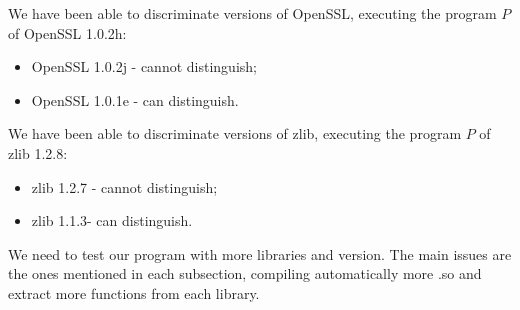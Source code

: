 \documentclass{article}
\begin{document}
        We have been able to discriminate versions of OpenSSL, executing the
        program $P$ of OpenSSL 1.0.2h:
        \begin{itemize}
            \item OpenSSL 1.0.2j - cannot distinguish; 
            \item OpenSSL 1.0.1e - can distinguish.
        \end{itemize}


        We have been able to discriminate versions of zlib, executing the
        program $P$ of zlib 1.2.8: 
        \begin{itemize}
            \item zlib 1.2.7 - cannot distinguish; 
            \item zlib 1.1.3- can distinguish.
        \end{itemize}


   	
        We need to test our program with more libraries and version. The main
        issues are the ones mentioned in each subsection, compiling
        automatically more .so and extract more functions from each library.

    
    

\iffalse    
    \subsection{Other tools}

		\subsubsection{Coccinelle} 
            Coccinelle uses static analysis to find pattern in C source code.
            Using a known bug as a pattern leads to discover if the patch was
            applied or not. It seems not to be interesting in our case,
            because we deal with binaries.  
        \subsubsection{n-gram}
\fi
\end{document}
